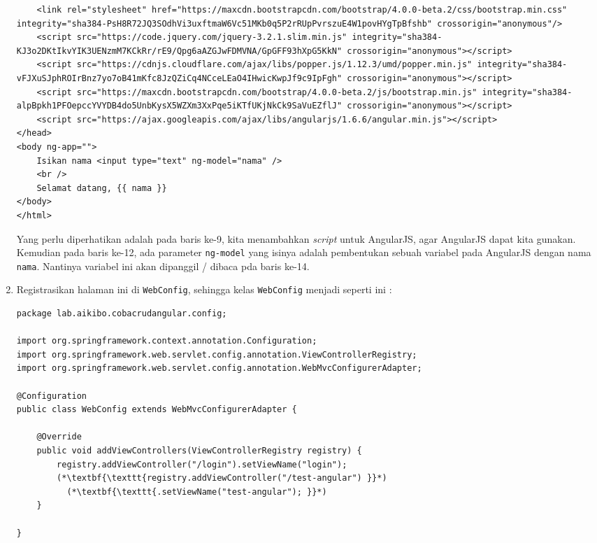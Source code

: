 \begin{enumerate}
\begin{lstlisting}
    <link rel="stylesheet" href="https://maxcdn.bootstrapcdn.com/bootstrap/4.0.0-beta.2/css/bootstrap.min.css" integrity="sha384-PsH8R72JQ3SOdhVi3uxftmaW6Vc51MKb0q5P2rRUpPvrszuE4W1povHYgTpBfshb" crossorigin="anonymous"/>
    <script src="https://code.jquery.com/jquery-3.2.1.slim.min.js" integrity="sha384-KJ3o2DKtIkvYIK3UENzmM7KCkRr/rE9/Qpg6aAZGJwFDMVNA/GpGFF93hXpG5KkN" crossorigin="anonymous"></script>
    <script src="https://cdnjs.cloudflare.com/ajax/libs/popper.js/1.12.3/umd/popper.min.js" integrity="sha384-vFJXuSJphROIrBnz7yo7oB41mKfc8JzQZiCq4NCceLEaO4IHwicKwpJf9c9IpFgh" crossorigin="anonymous"></script>
    <script src="https://maxcdn.bootstrapcdn.com/bootstrap/4.0.0-beta.2/js/bootstrap.min.js" integrity="sha384-alpBpkh1PFOepccYVYDB4do5UnbKysX5WZXm3XxPqe5iKTfUKjNkCk9SaVuEZflJ" crossorigin="anonymous"></script>
    <script src="https://ajax.googleapis.com/ajax/libs/angularjs/1.6.6/angular.min.js"></script>
</head>
<body ng-app="">
	Isikan nama <input type="text" ng-model="nama" />
	<br />
	Selamat datang, {{ nama }}
</body>
</html>
	\end{lstlisting}
	
	Yang perlu diperhatikan adalah pada baris ke-9, kita menambahkan \textit{script} untuk AngularJS, agar AngularJS dapat kita gunakan. Kemudian pada baris ke-12, ada parameter \texttt{ng-model} yang isinya adalah pembentukan sebuah variabel pada AngularJS dengan nama \texttt{nama}. Nantinya variabel ini akan dipanggil / dibaca pda baris ke-14.
	
	\item Registrasikan halaman ini di \texttt{WebConfig}, sehingga kelas \texttt{WebConfig} menjadi seperti ini :
	
	\begin{lstlisting}
package lab.aikibo.cobacrudangular.config;

import org.springframework.context.annotation.Configuration;
import org.springframework.web.servlet.config.annotation.ViewControllerRegistry;
import org.springframework.web.servlet.config.annotation.WebMvcConfigurerAdapter;

@Configuration
public class WebConfig extends WebMvcConfigurerAdapter {

	@Override
	public void addViewControllers(ViewControllerRegistry registry) {
		registry.addViewController("/login").setViewName("login");
	    (*\textbf{\texttt{registry.addViewController("/test-angular") }}*)
	      (*\textbf{\texttt{.setViewName("test-angular"); }}*)
	}

}
	\end{lstlisting}
	

\end{enumerate}
